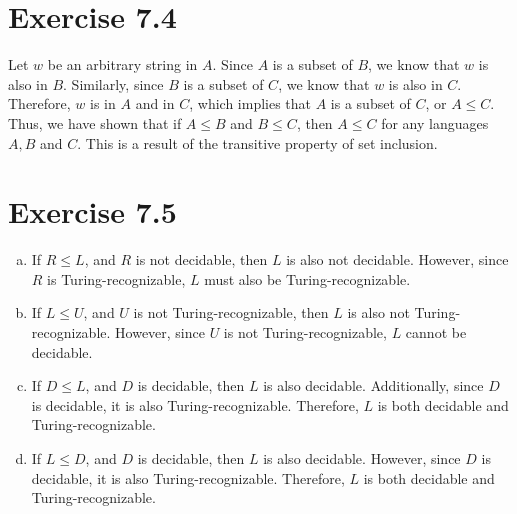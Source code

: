 \documentclass{article} %
\newcommand{\homeworkNumber}{7}
\begin{document}
\section*{Exercise \homeworkNumber.4}
Let $w$ be an arbitrary string in $A$. Since $A$ is a subset of $B$, we know that $w$ is also in $B$. Similarly, since $B$ is a subset of $C$, we know that $w$ is also in $C$. Therefore, $w$ is in $A$ and in $C$, which implies that $A$ is a subset of $C$, or $A \le C$.\\
Thus, we have shown that if $A \le B$ and $B \le C$, then $A \le C$ for any languages $A, B$ and $C$. This is a result of the transitive property of set inclusion.

\section*{Exercise \homeworkNumber.5}
\begin{enumerate}[(a)]
\item
If $R \le L$, and $R$ is not decidable, then $L$ is also not decidable. However, since $R$ is Turing-recognizable, $L$ must also be Turing-recognizable.
\item
If $L \le U$, and $U$ is not Turing-recognizable, then $L$ is also not Turing-recognizable. However, since $U$ is not Turing-recognizable, $L$ cannot be decidable.
\item
If $D \le L$, and $D$ is decidable, then $L$ is also decidable. Additionally, since $D$ is decidable, it is also Turing-recognizable. Therefore, $L$ is both decidable and Turing-recognizable.
\item
If $L \le D$, and $D$ is decidable, then $L$ is also decidable. However, since $D$ is decidable, it is also Turing-recognizable. Therefore, $L$ is both decidable and Turing-recognizable.
\end{enumerate}
\end{document}
